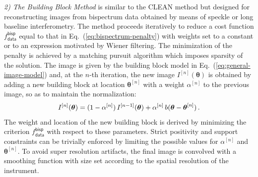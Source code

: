 \documentclass{article}
\newcommand{\Tag}[1]{\mathsf{#1}}        %
\newcommand{\V}[1]{\boldsymbol{#1}}      %
\newcommand{\wrt}{with respect to\xspace}
\newcommand{\Eq}[1]{Eq.~(\ref{#1})}
\newcommand{\Dirn}{\theta}            %
\newcommand{\VDirn}{\V{\Dirn}}
\newcommand{\Image}{I}
\newcommand{\BasisFunc}{b}
\newcommand{\DataTag}{\Tag{data}}
\newcommand{\BispectrumTag}{\Tag{bisp}}
\newcommand{\Fcost}{f}
\newcommand{\Fdata}{\Fcost_\DataTag}
\begin{document}
\textit{2) The Building Block Method}
\citep{Hofmann_Weigelt-1993-building_blocks} is similar to the CLEAN method
but designed for reconstructing images from bispectrum data obtained by means
of speckle or long baseline interferometry.  The method proceeds iteratively
to reduce a cost function $\Fdata^\BispectrumTag$ equal to that in
\Eq{eq:bispectrum-penalty} with weights set to a constant or to an expression
motivated by Wiener filtering.  The minimization of the penalty is achieved by
a matching pursuit algorithm which imposes sparsity of the solution.  The
image is given by the building block model in \Eq{eq:general-image-model} and,
at the $n$-th iteration, the new image $\Image^{[n]}(\VDirn)$ is obtained by
adding a new building block at location $\VDirn^{[n]}$ with a weight
$\alpha^{[n]}$ to the previous image, so as to maintain the normalization:
\begin{displaymath}
  \Image^{[n]}(\VDirn)
   = (1 - \alpha^{[n]})\,\Image^{[n - 1]}(\VDirn)
  + \alpha^{[n]} \, \BasisFunc(\VDirn - \VDirn^{[n]}) \, .\notag
\end{displaymath}
The weight and location of the new building block is derived by minimizing the
criterion $\Fdata^\BispectrumTag$ \wrt these parameters.  Strict positivity
and support constraints can be trivially enforced by limiting the possible
values for $\alpha^{[n]}$ and $\VDirn^{[n]}$. To avoid super
resolution artifacts, the final image is convolved with a smoothing function
with size set according to the spatial resolution of the instrument.

\end{document}
